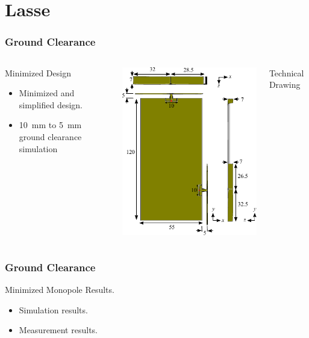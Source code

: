 \section{Lasse}
\begin{frame}[fragile]
  \frametitle{Ground Clearance}
  \begin{columns}[onlytextwidth,t]
    \begin{block}{Minimized Design}
      \begin{itemize}
      \item Minimized and simplified design.
      \item \SI{10}{mm} to \SI{5}{mm} ground clearance simulation
      \end{itemize}
    \end{block}
    \begin{center}
      \includegraphics[scale=0.7]{img/Lasse/3d_drawing.pdf}
    \end{center}
    Technical Drawing
  \end{columns}
\end{frame}

\begin{frame}
  \frametitle{Ground Clearance}
    \begin{block}{Minimized Monopole Results.}
      \begin{itemize}
      \item Simulation results.
      \item Measurement results.
      \end{itemize}
    \end{block}
\end{frame}


